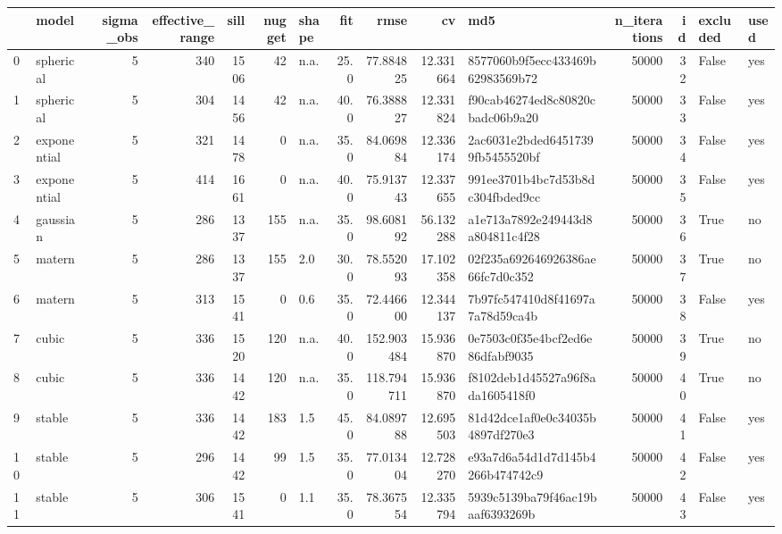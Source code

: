 \begin{tabular}{llrrrrlrrrlrrll}
\toprule
{} &        model &  sigma\_obs &  effective\_range &  sill &  nugget & shape &   fit &        rmse &         cv &                               md5 &  n\_iterations &  id &  excluded & used \\
\midrule
0  &    spherical &          5 &              340 &  1506 &      42 &  n.a. &  25.0 &   77.884825 &  12.331664 &  8577060b9f5ecc433469b62983569b72 &         50000 &  32 &     False &  yes \\
1  &    spherical &          5 &              304 &  1456 &      42 &  n.a. &  40.0 &   76.388827 &  12.331824 &  f90cab46274ed8c80820cbadc06b9a20 &         50000 &  33 &     False &  yes \\
2  &  exponential &          5 &              321 &  1478 &       0 &  n.a. &  35.0 &   84.069884 &  12.336174 &  2ac6031e2bded64517399fb5455520bf &         50000 &  34 &     False &  yes \\
3  &  exponential &          5 &              414 &  1661 &       0 &  n.a. &  40.0 &   75.913743 &  12.337655 &  991ee3701b4bc7d53b8dc304fbded9cc &         50000 &  35 &     False &  yes \\
4  &     gaussian &          5 &              286 &  1337 &     155 &  n.a. &  35.0 &   98.608192 &  56.132288 &  a1e713a7892e249443d8a804811c4f28 &         50000 &  36 &      True &   no \\
5  &       matern &          5 &              286 &  1337 &     155 &   2.0 &  30.0 &   78.552093 &  17.102358 &  02f235a692646926386ae66fc7d0c352 &         50000 &  37 &      True &   no \\
6  &       matern &          5 &              313 &  1541 &       0 &   0.6 &  35.0 &   72.446600 &  12.344137 &  7b97fc547410d8f41697a7a78d59ca4b &         50000 &  38 &     False &  yes \\
7  &        cubic &          5 &              336 &  1520 &     120 &  n.a. &  40.0 &  152.903484 &  15.936870 &  0e7503c0f35e4bcf2ed6e86dfabf9035 &         50000 &  39 &      True &   no \\
8  &        cubic &          5 &              336 &  1442 &     120 &  n.a. &  35.0 &  118.794711 &  15.936870 &  f8102deb1d45527a96f8ada1605418f0 &         50000 &  40 &      True &   no \\
9  &       stable &          5 &              336 &  1442 &     183 &   1.5 &  45.0 &   84.089788 &  12.695503 &  81d42dce1af0e0c34035b4897df270e3 &         50000 &  41 &     False &  yes \\
10 &       stable &          5 &              296 &  1442 &      99 &   1.5 &  35.0 &   77.013404 &  12.728270 &  e93a7d6a54d1d7d145b4266b474742c9 &         50000 &  42 &     False &  yes \\
11 &       stable &          5 &              306 &  1541 &       0 &   1.1 &  35.0 &   78.367554 &  12.335794 &  5939c5139ba79f46ac19baaf6393269b &         50000 &  43 &     False &  yes \\
\bottomrule
\end{tabular}
